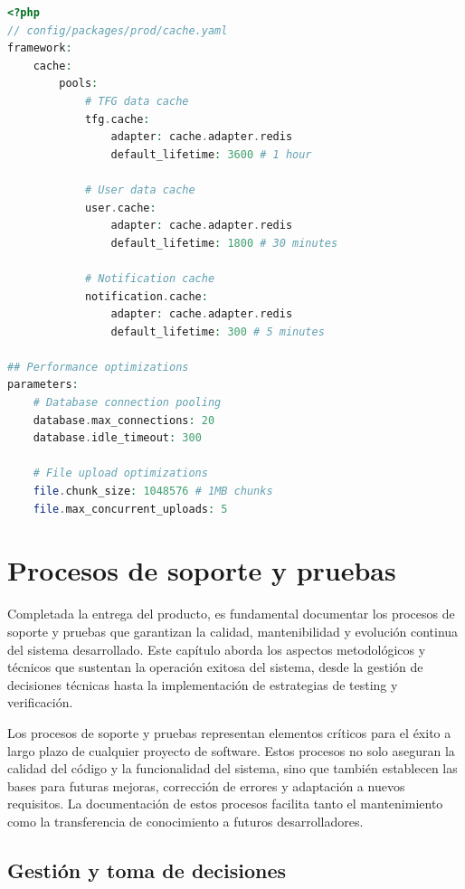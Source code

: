 \documentclass[12pt,a4paper,oneside]{report}
\begin{document}
\begin{lstlisting}[language=PHP]
<?php
// config/packages/prod/cache.yaml
framework:
    cache:
        pools:
            # TFG data cache
            tfg.cache:
                adapter: cache.adapter.redis
                default_lifetime: 3600 # 1 hour
                
            # User data cache  
            user.cache:
                adapter: cache.adapter.redis
                default_lifetime: 1800 # 30 minutes
                
            # Notification cache
            notification.cache:
                adapter: cache.adapter.redis
                default_lifetime: 300 # 5 minutes

## Performance optimizations
parameters:
    # Database connection pooling
    database.max_connections: 20
    database.idle_timeout: 300
    
    # File upload optimizations
    file.chunk_size: 1048576 # 1MB chunks
    file.max_concurrent_uploads: 5
\end{lstlisting}

\chapter{Procesos de soporte y
pruebas}\label{procesos-de-soporte-y-pruebas}
Completada la entrega del producto, es fundamental documentar los
procesos de soporte y pruebas que garantizan la calidad, mantenibilidad
y evolución continua del sistema desarrollado. Este capítulo aborda los
aspectos metodológicos y técnicos que sustentan la operación exitosa del
sistema, desde la gestión de decisiones técnicas hasta la implementación
de estrategias de testing y verificación.

Los procesos de soporte y pruebas representan elementos críticos para el
éxito a largo plazo de cualquier proyecto de software. Estos procesos no
solo aseguran la calidad del código y la funcionalidad del sistema, sino
que también establecen las bases para futuras mejoras, corrección de
errores y adaptación a nuevos requisitos. La documentación de estos
procesos facilita tanto el mantenimiento como la transferencia de
conocimiento a futuros desarrolladores.

\section{Gestión y toma de
decisiones}\label{gestiuxf3n-y-toma-de-decisiones}
\end{document}
